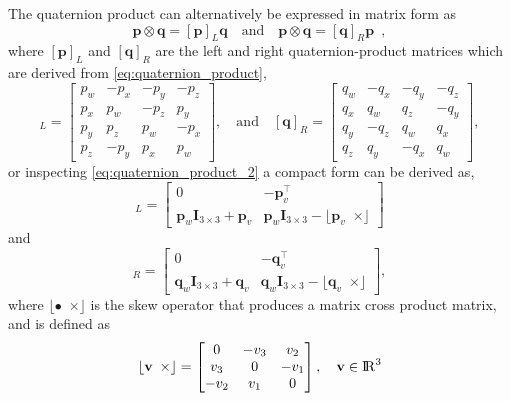 \documentclass{report}
\renewcommand{\Vec}[1]{{\mathbf{#1}}}
\newcommand{\Mat}[1]{{\mathbf{#1}}}
\newcommand{\real}{{\rm I\!R}}
\newcommand{\I}{{\Mat{I}}}
\newcommand{\Skew}[1]{{\lfloor #1 \enspace \times \rfloor}}
\newcommand{\Transpose}[1]{{{#1^{\top}}}}
\begin{document}
The quaternion product can alternatively be expressed in matrix form as
%
\begin{equation}
  \Vec{p} \otimes \Vec{q} = [\Vec{p}]_{L} \Vec{q}
  \quad \text{and} \quad
  \Vec{p} \otimes \Vec{q} = [\Vec{q}]_{R} \Vec{p} \enspace ,
\end{equation}
%
where $[\Vec{p}]_{L}$ and $[\Vec{q}]_{R}$ are the left and right
quaternion-product matrices which are derived from
\eqref{eq:quaternion_product},
%
\begin{equation}
  [\Vec{p}]_{L} =
  \begin{bmatrix}
    p_w & -p_x & -p_y & -p_z \\
    p_x & p_w & -p_z & p_y \\
    p_y & p_z & p_w & -p_x \\
    p_z & -p_y & p_x & p_w
  \end{bmatrix},
  \quad \text{and} \quad
  [\Vec{q}]_{R} =
  \begin{bmatrix}
    q_w & -q_x & -q_y & -q_z \\
    q_x & q_w & q_z & -q_y \\
    q_y & -q_z & q_w & q_x \\
    q_z & q_y & -q_x & q_w
  \end{bmatrix},
\end{equation}
%
or inspecting \eqref{eq:quaternion_product_2} a compact form can be derived as,
%
\begin{equation}
  [\Vec{p}]_{L} =
  \begin{bmatrix}
    0 & -\Transpose{\Vec{p}_{v}} \\
    \Vec{p}_w \I_{3 \times 3} + \Vec{p}_{v} &
    \Vec{p}_w \I_{3 \times 3} -\Skew{\Vec{p}_{v}}
  \end{bmatrix}
\end{equation}
%
and
%
\begin{equation}
  [\Vec{q}]_{R} =
  \begin{bmatrix}
    0 & -\Transpose{\Vec{q}_{v}} \\
    \Vec{q}_w \I_{3 \times 3} + \Vec{q}_{v} &
    \Vec{q}_w \I_{3 \times 3} -\Skew{\Vec{q}_{v}}
  \end{bmatrix},
\end{equation}
%
where $\Skew{\bullet}$ is the skew operator that produces a matrix cross
product matrix, and is defined as
%
\begin{equation}
  \Skew{\Vec{v}} =
  \begin{bmatrix}
    0 & -v_{3} & v_{2} \\
    v_{3} & 0 & -v_{1} \\
    -v_{2} & v_{1} & 0
  \end{bmatrix},
  \quad
  \Vec{v} \in \real^{3}
\end{equation}
%
\end{document}
